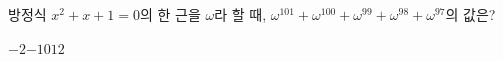 방정식 $x^2+x+1=0$의 한 근을 $\omega$라 할 때, $\omega^{101}+\omega^{100}+\omega^{99}+\omega^{98}+\omega^{97}$의 값은?
\begin{choices32}{$-2$}{$-1$}{$0$}{$1$}{$2$}\end{choices32}
